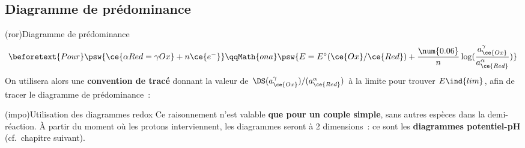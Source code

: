 \documentclass[../../main/main.tex]{subfiles}
\begin{document}
\subsection{Diagramme de prédominance}
\begin{tcb*}(ror){Diagramme de prédominance}
	\vspace{-10pt}
	\begin{gather*}
		\beforetext{Pour}
		\psw{
			\ce{\alpha Red = \gamma Ox} + n\ce{e^-}
		}
		\qqMath{on a}
		\psw{
			E = E^\circ(\ce{Ox}/\ce{Red}) + \frac{\num{0.06}}{n} \log
			(\frac{a_{\ce{Ox}}^{\gamma}}{a_{\ce{Red}}^{\alpha}})
		}
	\end{gather*}
	On utilisera alors une \textbf{convention de tracé} donnant la valeur de
	$\DS (a_{\ce{Ox}}^{\gamma})/(a_{\ce{Red}}^{\alpha})$ à la limite pour
	trouver $E\ind{lim}$, afin de tracer le diagramme de prédominance~:
	\vspace{-15pt}
	\begin{center}
		\vspace{-15pt}
	\end{center}
\end{tcb*}
\begin{tcb*}(impo){Utilisation des diagrammes redox}
	Ce raisonnement n'est valable \textbf{que pour un couple simple}, sans autres
	espèces dans la demi-réaction. À partir du moment où les protons 
	interviennent, les diagrammes seront à 2 dimensions~: ce sont les
	\textbf{diagrammes potentiel-pH} (cf.\ chapitre suivant).
\end{tcb*}
\end{document}
